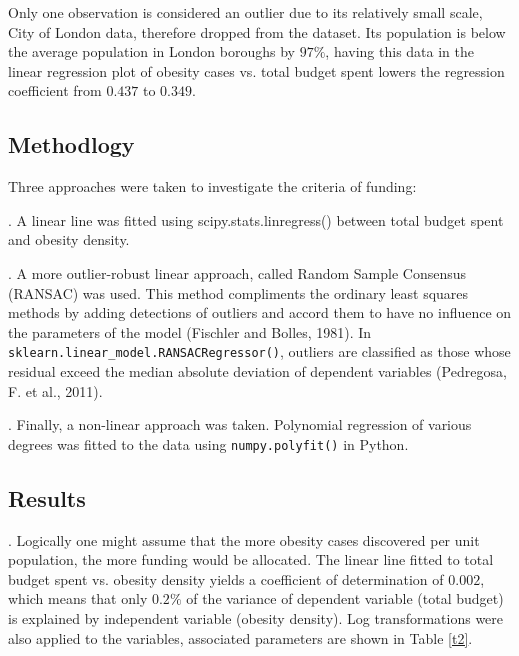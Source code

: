 \documentclass[12pt]{article}
\begin{document}
Only one observation is considered an outlier due to its relatively small scale, City of London data,  therefore dropped from the dataset. Its population is below the average population in London boroughs by $97\%$, having this data in the linear regression plot of obesity cases vs. total budget spent lowers the regression coefficient from $0.437$ to $0.349$. 


\subsection{Methodlogy}
Three approaches were taken to investigate the criteria of funding:

. 
A linear line was fitted using scipy.stats.linregress() between total budget spent and obesity density. 


.
A more outlier-robust linear approach, called Random Sample Consensus (RANSAC) was used. This method compliments the ordinary least squares methods by adding detections of outliers and accord them to have no influence on the parameters of the model (Fischler and Bolles, 1981). In \verb|sklearn.linear_model.RANSACRegressor()|, outliers are classified as those whose residual exceed the median absolute deviation of dependent variables (Pedregosa, F. et al., 2011).

.
Finally, a non-linear approach was taken. Polynomial regression of various degrees was fitted to the data using \verb|numpy.polyfit()| in Python. 


\subsection{Results}
. Logically one might assume that the more obesity cases discovered per unit population, the more funding would be allocated. The linear line fitted to total budget spent vs. obesity density yields a coefficient of determination of $0.002$, which means that only $0.2\%$ of the variance of dependent variable (total budget) is explained by independent variable (obesity density). Log transformations were also applied to the variables, associated parameters are shown in Table \eqref{t2}. 
\end{document}
